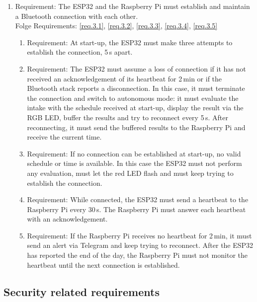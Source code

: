 \begin{enumerate}[label*=\arabic*.]
		\item \label{req.3} Requirement: The ESP32 and the Raspberry Pi must establish and maintain a Bluetooth connection with each other. \\
		Folge Requirements: \ref{req.3.1}, \ref{req.3.2}, \ref{req.3.3}, \ref{req.3.4}, \ref{req.3.5}
		\begin{enumerate}[label*=\arabic*.]
			\item \label{req.3.1} Requirement: At start-up, the ESP32 must make three attempts to establish the connection, 5\,s apart.
			\item \label{req.3.2} Requirement: The ESP32 must assume a loss of connection if it has not received an acknowledgement of its heartbeat for 2\,min or if the Bluetooth stack reports a disconnection. In this case, it must terminate the connection and switch to autonomous mode: it must evaluate the intake
			with the schedule received at start-up, display the result via the RGB LED, buffer the results 
			and try to reconnect every 5\,s. After reconnecting, it must send the buffered results to the Raspberry Pi and receive the current time.
			\item \label{req.3.3} Requirement: If no connection can be established at start-up, no valid schedule or time is available. In this case the ESP32 must not perform any evaluation, must let the red LED flash and must keep trying to establish the connection.
			\item \label{req.3.4} Requirement: While connected, the ESP32 must send a heartbeat to the Raspberry Pi every 30\,s. The Raspberry Pi must answer each heartbeat with an acknowledgement.
			\item \label{req.3.5} Requirement: If the Raspberry Pi receives no heartbeat for 2\,min, it must send an alert via Telegram and keep trying to
			reconnect. After the ESP32 has reported the end of the day, the Raspberry Pi must not monitor the heartbeat until the next connection is established.
		\end{enumerate}
	\end{enumerate}

\subsection{Security related requirements}

